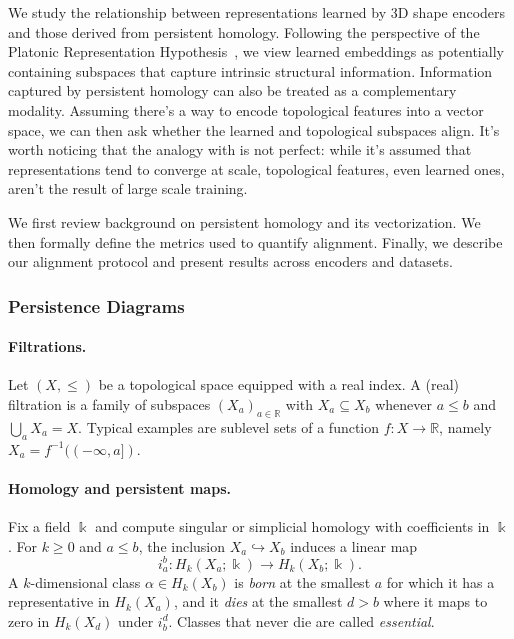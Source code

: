 We study the relationship between representations learned by 3D shape encoders and those derived from persistent homology. Following the perspective of the Platonic Representation Hypothesis~\cite{plato,platonic}, we view learned embeddings as potentially containing subspaces that capture intrinsic structural information. Information captured by persistent homology can also be treated as a complementary modality. Assuming there's a way to encode topological features into a vector space, we can then ask whether the learned and topological subspaces align. It's worth noticing that the analogy with \cite{platonic} is not perfect: while it's assumed that representations tend to converge at scale, topological features, even learned ones, aren't the result of large scale training.

We first review background on persistent homology and its vectorization. We then formally define the metrics used to quantify alignment. Finally, we describe our alignment protocol and present results across encoders and datasets.


\subsubsection{Persistence Diagrams}
\label{sssec:persistence_diagrams}


\paragraph{Filtrations.}
Let $(X, \leq)$ be a topological space equipped with a real index. A (real) filtration is a family of subspaces $(X_a)_{a\in\mathbb{R}}$ with $X_a \subseteq X_b$ whenever $a \leq b$ and $\bigcup_a X_a = X$. Typical examples are sublevel sets of a function $f:X\to\mathbb{R}$, namely $X_a = f^{-1}((-\infty,a])$.

\paragraph{Homology and persistent maps.}
Fix a field $\Bbbk$ and compute singular or simplicial homology with coefficients in $\Bbbk$. For $k\ge 0$ and $a\le b$, the inclusion $X_a \hookrightarrow X_b$ induces a linear map
\begin{equation}
i_{a}^{b}: H_k(X_a;\Bbbk) \longrightarrow H_k(X_b;\Bbbk).
\end{equation}
A $k$-dimensional class $\alpha\in H_k(X_b)$ is \emph{born} at the smallest $a$ for which it has a representative in $H_k(X_a)$, and it \emph{dies} at the smallest $d>b$ where it maps to zero in $H_k(X_d)$ under $i_{b}^{d}$. Classes that never die are called \emph{essential}.

